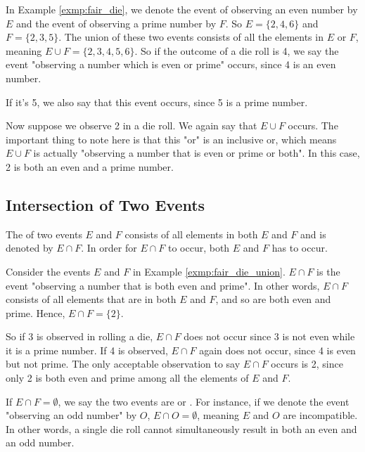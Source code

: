 \begin{exmp}\label{exmp:fair_die_union}
	In Example \autoref{exmp:fair_die}, we denote the event of observing an even number by \( E \)
	and the event of observing a prime number by \( F \).
	So \( E = \{ 2, 4, 6 \} \) and \( F = \{ 2, 3, 5 \} \).
	The union of these two events consists of all the elements in \( E \) or \( F \),
	meaning \( E \cup F = \{ 2, 3, 4, 5, 6 \} \).
	So if the outcome of a die roll is 4, we say the event "observing a number which is even or prime" occurs,
	since 4 is an even number.
	
	If it's 5, we also say that this event occurs, since 5 is a prime number.
	
	Now suppose we observe 2 in a die roll. We again say that \( E \cup F \) occurs.
	The important thing to note here is that this "or" is an inclusive or, which means \( E \cup F \)
	is actually "observing a number that is even or prime or both".
	In this case, 2 is both an even and a prime number.
\end{exmp}

\subsection{Intersection of Two Events}

The  of two events \( E \) and \( F \) consists of all elements in both \( E \) and \( F \) and is denoted by \( E \cap F \).
In order for \( E \cap F \) to occur, both \( E \) and \( F \) has to occur.

\begin{exmp}
	Consider the events \( E \) and \( F \) in Example \autoref{exmp:fair_die_union}.
	\( E \cap F \) is the event "observing a number that is both even and prime".
	In other words, \( E \cap F \) consists of all elements that are in both \( E \) and \( F \),
	and so are both even and prime.
	Hence, \( E \cap F = \{ 2 \} \).

	So if 3 is observed in rolling a die, \( E \cap F \) does not occur since 3 is not even while it is a prime number.
	If 4 is observed, \( E \cap F \) again does not occur, since 4 is even but not prime.
	The only acceptable observation to say \( E \cap F \) occurs is 2, since only 2 is both even and prime among all the elements of \( E \) and \( F \).
\end{exmp}

If \( E \cap F = \emptyset \), we say the two events are  or .
For instance, if we denote the event "observing an odd number" by \( O \),
\( E \cap O = \emptyset \), meaning \( E \) and \( O \) are incompatible.
In other words, a single die roll cannot simultaneously result in both an even and an odd number.

